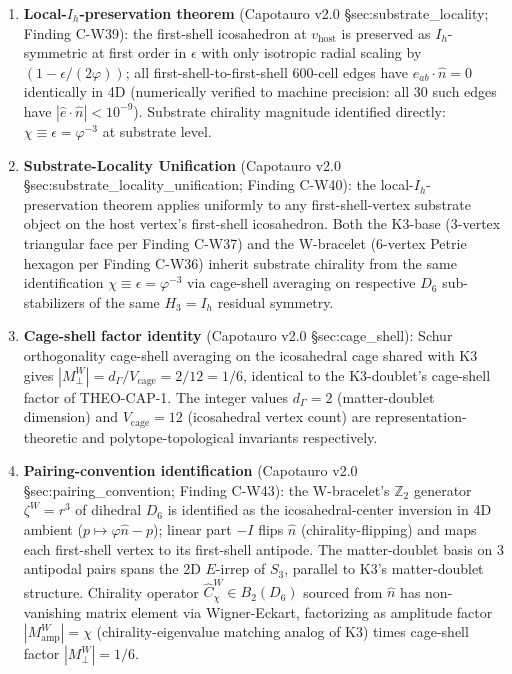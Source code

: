 \documentclass[11pt,letterpaper]{article}
\newcommand{\Cchi}{\hat{C}_\chi}
\newcommand{\Dsix}{D_6}
\newcommand{\Sthree}{S_3}
\newcommand{\Hthree}{H_3}
\newcommand{\Ih}{I_h}
\newcommand{\Vcage}{V_{\text{cage}}}
\newcommand{\dGamma}{d_\Gamma}
\begin{document}
\begin{enumerate}[leftmargin=*]
\item \textbf{Local-$\Ih$-preservation theorem} (Capotauro v2.0 \cite{Capotauro} §sec:substrate\_locality; Finding C-W39): the first-shell icosahedron at $v_{\text{host}}$ is preserved as $\Ih$-symmetric at first order in $\epsilon$ with only isotropic radial scaling by $(1 - \epsilon/(2\varphi))$; all first-shell-to-first-shell 600-cell edges have $\hat{e}_{ab} \cdot \hat{n} = 0$ identically in 4D (numerically verified to machine precision: all 30 such edges have $|\hat{e} \cdot \hat{n}| < 10^{-9}$). Substrate chirality magnitude identified directly: $\chi \equiv \epsilon = \varphi^{-3}$ at substrate level.

\item \textbf{Substrate-Locality Unification} (Capotauro v2.0 \cite{Capotauro} §sec:substrate\_locality\_unification; Finding C-W40): the local-$\Ih$-preservation theorem applies uniformly to any first-shell-vertex substrate object on the host vertex's first-shell icosahedron. Both the K3-base (3-vertex triangular face per Finding C-W37) and the W-bracelet (6-vertex Petrie hexagon per Finding C-W36) inherit substrate chirality from the same identification $\chi \equiv \epsilon = \varphi^{-3}$ via cage-shell averaging on respective $\Dsix$ sub-stabilizers of the same $\Hthree = \Ih$ residual symmetry.

\item \textbf{Cage-shell factor identity} (Capotauro v2.0 \cite{Capotauro} §sec:cage\_shell): Schur orthogonality cage-shell averaging on the icosahedral cage shared with K3 gives $|M_\perp^W| = \dGamma/\Vcage = 2/12 = 1/6$, identical to the K3-doublet's cage-shell factor of THEO-CAP-1. The integer values $\dGamma = 2$ (matter-doublet dimension) and $\Vcage = 12$ (icosahedral vertex count) are representation-theoretic and polytope-topological invariants respectively.

\item \textbf{Pairing-convention identification} (Capotauro v2.0 \cite{Capotauro} §sec:pairing\_convention; Finding C-W43): the W-bracelet's $\mathbb{Z}_2$ generator $\zeta^W = r^3$ of dihedral $D_6$ is identified as the icosahedral-center inversion in 4D ambient ($p \mapsto \varphi\hat{n} - p$); linear part $-I$ flips $\hat{n}$ (chirality-flipping) and maps each first-shell vertex to its first-shell antipode. The matter-doublet basis on 3 antipodal pairs spans the 2D $E$-irrep of $\Sthree$, parallel to K3's matter-doublet structure. Chirality operator $\Cchi^W \in B_2(D_6)$ sourced from $\hat{n}$ has non-vanishing matrix element via Wigner-Eckart, factorizing as amplitude factor $|M_{\text{amp}}^W| = \chi$ (chirality-eigenvalue matching analog of K3) times cage-shell factor $|M_\perp^W| = 1/6$.
\end{enumerate}
\end{document}
